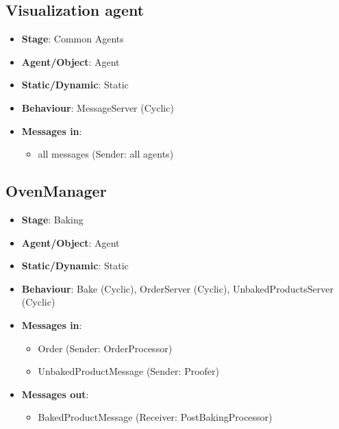 \documentclass[12pt]{article}
\begin{document}
\subsection{Visualization agent}
\begin{itemize}
    \item \textbf{Stage}: Common Agents 
    \item \textbf{Agent/Object}: Agent
    \item \textbf{Static/Dynamic}: Static
    \item \textbf{Behaviour}: MessageServer (Cyclic)
    \item \textbf{Messages in}:
        \begin{itemize}
            \item  all messages (Sender: all agents)
        \end{itemize}
\end{itemize}

\subsection{OvenManager}
\begin{itemize}
    \item \textbf{Stage}: Baking 
    \item \textbf{Agent/Object}: Agent 
    \item \textbf{Static/Dynamic}: Static
    \item \textbf{Behaviour}: Bake (Cyclic), OrderServer (Cyclic), UnbakedProductsServer (Cyclic) 
    \item \textbf{Messages in}:
        \begin{itemize}
            \item  Order (Sender: OrderProcessor)
            \item  UnbakedProductMessage (Sender: Proofer)
        \end{itemize}
    \item \textbf{Messages out}:
        \begin{itemize}
            \item  BakedProductMessage (Receiver: PostBakingProcessor)
        \end{itemize}
\end{itemize}
\newpage{}
\end{document}
